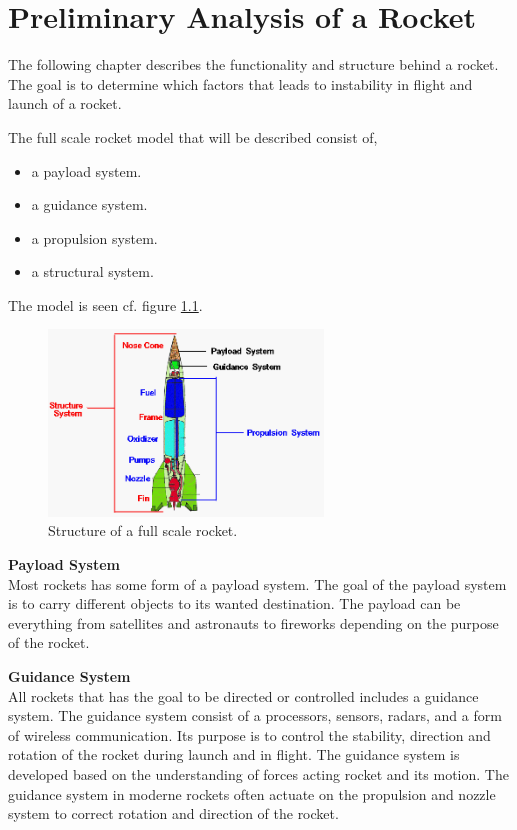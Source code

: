 \chapter{Preliminary Analysis of a Rocket}
The following chapter describes the functionality and structure behind a rocket. The goal is to determine which factors that leads to instability in flight and launch of a rocket. 



The full scale rocket model that will be described consist of,
\begin{itemize}[noitemsep]
\item a payload system.
\item a guidance system.
\item a propulsion system. 
\item a structural system.
\end{itemize}    
The model is seen cf. figure \ref{fig:RocketStructure}.
\begin{figure}[htbp]
	\centering
 	\includegraphics[width=0.65\textwidth]{figures/RocketStructure.png} 
 	\caption{Structure of a full scale rocket.}
 	\label{fig:RocketStructure}
\end{figure}

\textbf{Payload System}\\
Most rockets has some form of a payload system. The goal of the payload system is to carry different objects to its wanted destination. The payload can be everything from satellites and astronauts to fireworks depending on the purpose of the rocket. 


\textbf{Guidance System}\\
All rockets that has the goal to be directed or controlled includes a guidance system. The guidance system consist of a processors, sensors, radars, and  a form of wireless communication. Its purpose is to control the stability, direction and rotation of the rocket during launch and in flight. The guidance system is developed based on the understanding of forces acting rocket and its motion. The guidance system in moderne rockets often actuate on the propulsion and nozzle system to correct rotation and direction of the rocket.

